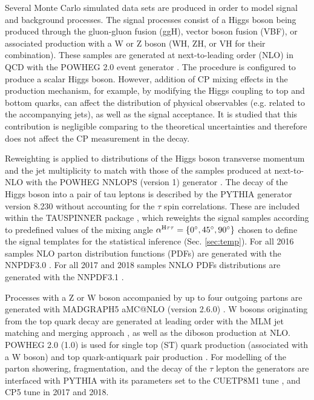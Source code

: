 Several Monte Carlo simulated data sets are produced in order to model signal and background processes. The signal processes consist of a Higgs boson being produced through the gluon-gluon fusion (ggH), vector boson fusion (VBF), or associated production with a W or Z boson (WH, ZH, or VH for their combination). These samples are generated at next-to-leading order (NLO) in QCD with the POWHEG 2.0 event generator \cite{Nason:2004rx,Frixione:2007vw,Alioli:2010xd,Bagnaschi:2011tu,Nason:2009ai,Jezo:2015aia,Granata:2017iod}. The procedure is configured to produce a scalar Higgs boson. However, addition of CP mixing effects in the production mechanism, for example, by modifying the Higgs coupling to top and bottom quarks, can affect the distribution of physical observables (e.g. related to the accompanying jets), as well as the signal acceptance. It is studied that this contribution is negligible comparing to the theoretical uncertainties and therefore does not affect the CP measurement in the \htt decay.

Reweighting is applied to distributions of the Higgs boson transverse momentum and the jet multiplicity to match with those of the samples produced at next-to-NLO with the POWHEG NNLOPS (version 1) generator \cite{Hamilton:2013fea,Hamilton:2015nsa}. The decay of the Higgs boson into a pair of tau leptons is described by the PYTHIA generator version 8.230 \cite{Sjostrand:2014zea} without accounting for the $\tau$ spin correlations. These are included within the TAUSPINNER package \cite{Przedzinski:2018ett}, which reweights the signal samples according to predefined values of the mixing angle $\alpha^{\text{H}\tau\tau}=\{0^\circ, 45^\circ, 90^\circ\}$ chosen to define the signal templates for the statistical inference (Sec. \ref{sec:temp}). For all 2016 samples NLO parton distribution functions (PDFs) are generated with the NNPDF3.0 \cite{NNPDF:2014otw}. For all 2017 and 2018 samples NNLO PDFs distributions are generated with the NNPDF3.1 \cite{NNPDF:2017mvq}.

Processes with a Z or W boson accompanied by up to four outgoing partons are generated with MADGRAPH5 aMC@NLO (version 2.6.0) \cite{Alwall:2014hca}. W bosons originating from the top quark decay are generated at leading order with the MLM jet matching and merging approach \cite{Alwall:2007fs}, as well as the diboson production at NLO. POWHEG 2.0 (1.0) is used for single top (ST) quark production (associated with a W boson) \cite{Re:2010bp,Frederix:2012dh} and top quark-antiquark pair production \cite{Alioli:2011as}. For modelling of the parton showering, fragmentation, and the decay of the $\tau$ lepton the generators are interfaced with PYTHIA with its parameters set to the CUETP8M1 tune \cite{CMS:2015wcf} , and CP5 tune \cite{CMS:2019csb} in 2017 and 2018. 

